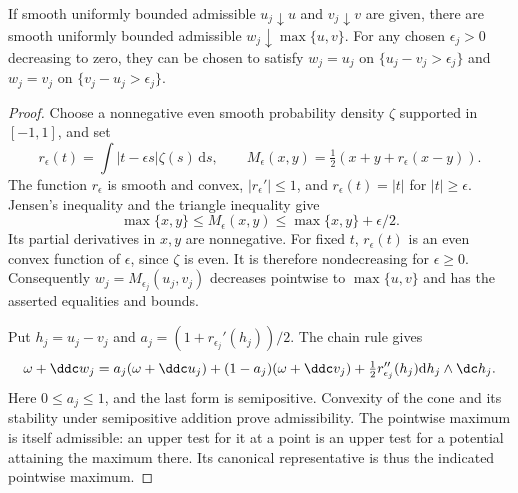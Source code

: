 \begin{lemma}\label{draft625:regularized-maximum}
If smooth uniformly bounded admissible $u_j\downarrow u$ and
$v_j\downarrow v$ are given, there are smooth uniformly bounded
admissible $w_j\downarrow\max\{u,v\}$. For any chosen
$\epsilon_j>0$ decreasing to zero, they can be chosen to satisfy
$w_j=u_j$ on $\{u_j-v_j>\epsilon_j\}$ and
$w_j=v_j$ on $\{v_j-u_j>\epsilon_j\}$.
\end{lemma}
\begin{proof}
Choose a nonnegative even smooth probability density $\zeta$
supported in $[-1,1]$, and set
\[
 r_\epsilon(t)=\int |t-\epsilon s|\zeta(s)\,\mathrm ds,
 \qquad M_\epsilon(x,y)=\tfrac12(x+y+r_\epsilon(x-y)).
\]
The function $r_\epsilon$ is smooth and convex,
$|r_\epsilon'|\leq1$, and $r_\epsilon(t)=|t|$ for
$|t|\geq\epsilon$. Jensen's inequality and the triangle inequality
give
\[
 \max\{x,y\}\leq M_\epsilon(x,y)
                     \leq\max\{x,y\}+\epsilon/2.
\]
Its partial derivatives in $x,y$ are nonnegative. For fixed $t$,
$r_\epsilon(t)$ is an even convex function of $\epsilon$, since
$\zeta$ is even. It is therefore nondecreasing for $\epsilon\geq0$.
Consequently $w_j=M_{\epsilon_j}(u_j,v_j)$ decreases pointwise to
$\max\{u,v\}$ and has the asserted equalities and bounds.

Put $h_j=u_j-v_j$ and
$a_j=(1+r_{\epsilon_j}'(h_j))/2$. The chain rule gives
\[
 \omega+\ddc w_j
 =a_j(\omega+\ddc u_j)+(1-a_j)(\omega+\ddc v_j)
       +\tfrac12r_{\epsilon_j}''(h_j)
                    \mathrm dh_j\wedge\dc h_j.
\]
Here $0\leq a_j\leq1$, and the last form is semipositive.
Convexity of the cone and its stability under semipositive addition
prove admissibility. The pointwise maximum is itself admissible:
an upper test for it at a point is an upper test for a potential
attaining the maximum there. Its canonical representative is thus
the indicated pointwise maximum.
\end{proof}


